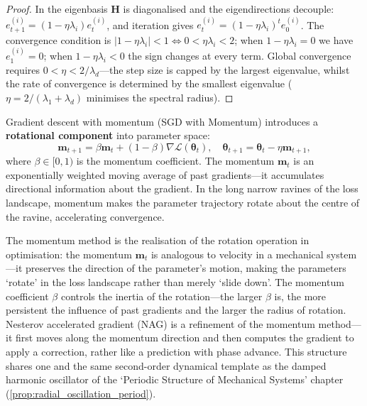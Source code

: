 \begin{proof}
In the eigenbasis $\mathbf{H}$ is diagonalised and the eigendirections decouple: $e_{t+1}^{(i)} = (1-\eta\lambda_i) e_t^{(i)}$, and iteration gives $e_t^{(i)} = (1-\eta\lambda_i)^t e_0^{(i)}$. The convergence condition is $|1-\eta\lambda_i| < 1 \Leftrightarrow 0 < \eta\lambda_i < 2$; when $1-\eta\lambda_i = 0$ we have $e_1^{(i)} = 0$; when $1-\eta\lambda_i < 0$ the sign changes at every term. Global convergence requires $0 < \eta < 2/\lambda_d$---the step size is capped by the largest eigenvalue, whilst the rate of convergence is determined by the smallest eigenvalue ($\eta = 2/(\lambda_1+\lambda_d)$ minimises the spectral radius).
\end{proof}

\begin{proposition}\label{prop:momentum_rotation}
Gradient descent with momentum (SGD with Momentum) introduces a \textbf{rotational component} into parameter space:
\[
\mathbf{m}_{t+1} = \beta \mathbf{m}_t + (1-\beta) \nabla \mathcal{L}(\boldsymbol{\theta}_t), \quad \boldsymbol{\theta}_{t+1} = \boldsymbol{\theta}_t - \eta \mathbf{m}_{t+1},
\]
where $\beta \in [0,1)$ is the momentum coefficient. The momentum $\mathbf{m}_t$ is an exponentially weighted moving average of past gradients---it accumulates directional information about the gradient. In the long narrow ravines of the loss landscape, momentum makes the parameter trajectory rotate about the centre of the ravine, accelerating convergence.

The momentum method is the realisation of the rotation operation in optimisation: the momentum $\mathbf{m}_t$ is analogous to velocity in a mechanical system---it preserves the direction of the parameter's motion, making the parameters `rotate' in the loss landscape rather than merely `slide down'. The momentum coefficient $\beta$ controls the inertia of the rotation---the larger $\beta$ is, the more persistent the influence of past gradients and the larger the radius of rotation. Nesterov accelerated gradient (NAG) is a refinement of the momentum method---it first moves along the momentum direction and then computes the gradient to apply a correction, rather like a prediction with phase advance. This structure shares one and the same second-order dynamical template as the damped harmonic oscillator of the `Periodic Structure of Mechanical Systems' chapter (\cref{prop:radial_oscillation_period}).
\end{proposition}

